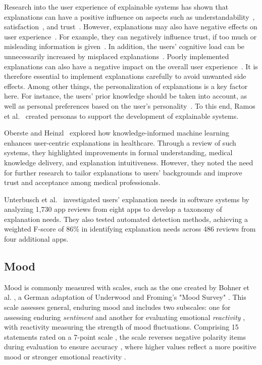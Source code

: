 Research into the user experience of explainable systems has shown that explanations can have a positive influence on aspects such as understandability~\cite{id955_dominguez2020,id1313_muhammad2016}, satisfaction~\cite{id731_bellini2018,id770_tran2019}, and trust~\cite{id731_bellini2018,id708_wang2018}. However, explanations may also have negative effects on user experience~\cite{chazette2020explainability,deters2024UXandExplainability,nunes2017systematic}. For example, they can negatively influence trust, if too much or misleading information is given~\cite{kizilcec2016trustAndTransparency,sadeghi2024explanation}. In addition, the users' cognitive load can be unnecessarily increased by misplaced explanations~\cite{chazette2020explainability,nunes2017systematic}. Poorly implemented explanations can also have a negative impact on the overall user experience~\cite{deters2024UXandExplainability}. It is therefore essential to implement explanations carefully to avoid unwanted side effects. Among other things, the personalization of explanations is a key factor here. For instance, the users' prior knowledge should be taken into account, as well as personal preferences based on the user's personality~\cite{deters2024qualitymodel}. To this end, Ramos et al.~\cite{ramos2021modeling} created personas to support the development of explainable systems.

Oberste and Heinzl~\cite{oberste2023explainabilityWithPriorKnowledge} explored how knowledge-informed machine learning enhances user-centric explanations in healthcare. Through a review of such systems, they highlighted improvements in formal understanding, medical knowledge delivery, and explanation intuitiveness. However, they noted the need for further research to tailor explanations to users’ backgrounds and improve trust and acceptance among medical professionals.

Unterbusch et al.~\cite{unterbusch2023explanation} investigated users' explanation needs in software systems by analyzing 1,730 app reviews from eight apps to develop a taxonomy of explanation needs. They also tested automated detection methods, achieving a weighted F-score of 86\% in identifying explanation needs across 486 reviews from four additional apps.

\subsection{Mood}
\label{sec:sentiment}
Mood is commonly measured with scales, such as the one created by Bohner et al. \cite{bohner1991stimmungs}, a German adaptation of Underwood and Froming’s "Mood Survey" \cite{underwood1980mood}. This scale assesses general, enduring mood \cite{bohner1997stimmungsskala} and includes two subscales: one for assessing enduring \textit{sentiment} and another for evaluating emotional \textit{reactivity} \cite{bohner1997stimmungsskala}, with reactivity measuring the strength of mood fluctuations. Comprising 15 statements rated on a 7-point scale \cite{bohner1997stimmungsskala}, the scale reverses negative polarity items during evaluation to ensure accuracy \cite{bohner1997stimmungsskala}, where higher values reflect a more positive mood or stronger emotional reactivity \cite{bohner1997stimmungsskala}.

